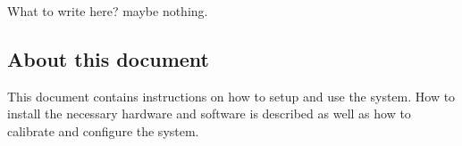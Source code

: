 What to write here? maybe nothing.

\subsection{About this document}
This document contains instructions on how to setup and use the system. How to install the necessary hardware and software is described as well as how to calibrate and configure the system.
